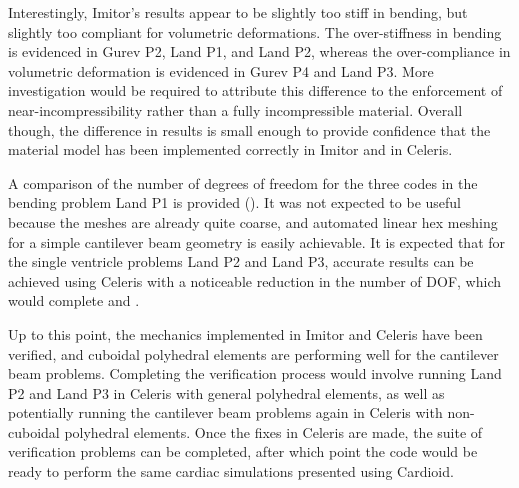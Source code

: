 Interestingly, Imitor's results appear to be slightly too stiff in bending, but slightly too compliant for volumetric deformations. The over-stiffness in bending is evidenced in Gurev P2, Land P1, and Land P2, whereas the over-compliance in volumetric deformation is evidenced in Gurev P4 and Land P3. More investigation would be required to attribute this difference to the enforcement of near-incompressibility rather than a fully incompressible material. Overall though, the difference in results is small enough to provide confidence that the material model has been implemented correctly in Imitor and in Celeris.

A comparison of the number of degrees of freedom for the three codes in the bending problem Land P1 is provided (). It was not expected to be useful because the meshes are already quite coarse, and automated linear hex meshing for a simple cantilever beam geometry is easily achievable. It is expected that for the single ventricle problems Land P2 and Land P3, accurate results can be achieved using Celeris with a noticeable reduction in the number of DOF, which would complete  and .

Up to this point, the mechanics implemented in Imitor and Celeris have been verified, and cuboidal polyhedral elements are performing well for the cantilever beam problems. Completing the verification process would involve running Land P2 and Land P3 in Celeris with general polyhedral elements, as well as potentially running the cantilever beam problems again in Celeris with non-cuboidal polyhedral elements. Once the fixes in Celeris are made, the suite of verification problems can be completed, after which point the code would be ready to perform the same cardiac simulations presented using Cardioid.

